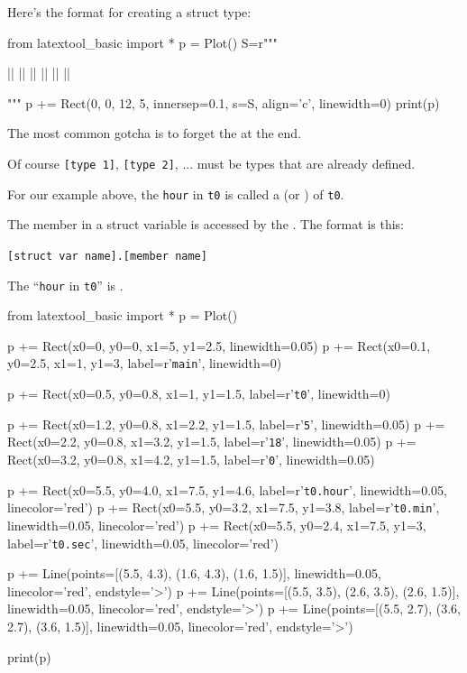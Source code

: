 Here's the format for creating a struct type:

\begin{python}
from latextool_basic import *
p = Plot()
S=r"""
\begin{consolethree}[escapeinside=||]
||
|\EMPHASIZE{\{}|
    ||
    ||
    ||
|\EMPHASIZE{\};}|
\end{consolethree}
"""
p += Rect(0, 0, 12, 5, innersep=0.1, s=S, align='c', linewidth=0)
print(p)
\end{python}

The most common gotcha is to forget the  at the end.

Of course \texttt{[type 1]}, \texttt{[type 2]}, ... must be types
that are already defined.

For our example above, the \texttt{hour} in \texttt{t0} is called a
 (or ) of \texttt{t0}.

The member in a struct variable is accessed by the . The format is this:

\verb![struct var name].[member name]!

The ``\texttt{hour} in \texttt{t0}'' is .

\begin{python}
from latextool_basic import *
p = Plot()

p += Rect(x0=0, y0=0, x1=5, y1=2.5, linewidth=0.05)
p += Rect(x0=0.1, y0=2.5, x1=1, y1=3, label=r'{\tt main}', linewidth=0)

p += Rect(x0=0.5, y0=0.8, x1=1, y1=1.5, label=r'{\tt t0}', linewidth=0)

p += Rect(x0=1.2, y0=0.8, x1=2.2, y1=1.5, label=r'{\tt 5}', linewidth=0.05)
p += Rect(x0=2.2, y0=0.8, x1=3.2, y1=1.5, label=r'{\tt 18}', linewidth=0.05)
p += Rect(x0=3.2, y0=0.8, x1=4.2, y1=1.5, label=r'{\tt 0}', linewidth=0.05)

p += Rect(x0=5.5, y0=4.0, x1=7.5, y1=4.6, label=r'{\tt t0.hour}', linewidth=0.05, linecolor='red')
p += Rect(x0=5.5, y0=3.2, x1=7.5, y1=3.8, label=r'{\tt t0.min}', linewidth=0.05, linecolor='red')
p += Rect(x0=5.5, y0=2.4, x1=7.5, y1=3, label=r'{\tt t0.sec}', linewidth=0.05, linecolor='red')

p += Line(points=[(5.5, 4.3), (1.6, 4.3), (1.6, 1.5)], linewidth=0.05, linecolor='red', endstyle='>')
p += Line(points=[(5.5, 3.5), (2.6, 3.5), (2.6, 1.5)], linewidth=0.05, linecolor='red', endstyle='>')
p += Line(points=[(5.5, 2.7), (3.6, 2.7), (3.6, 1.5)], linewidth=0.05, linecolor='red', endstyle='>')

print(p)
\end{python}

